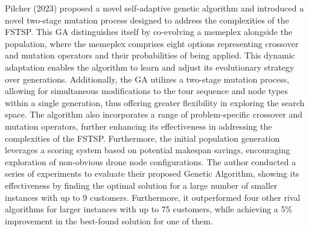 \documentclass{article}
\begin{document}
	\par
	Pilcher (2023) \cite{Pilcher2023} proposed a novel self-adaptive genetic algorithm and introduced a novel two-stage mutation process designed to address the complexities of the FSTSP. This GA distinguishes itself by co-evolving a memeplex alongside the population, where the memeplex comprises eight options representing crossover and mutation operators and their probabilities of being applied. This dynamic adaptation enables the algorithm to learn and adjust its evolutionary strategy over generations. Additionally, the GA utilizes a two-stage mutation process, allowing for simultaneous modifications to the tour sequence and node types within a single generation, thus offering greater flexibility in exploring the search space. The algorithm also incorporates a range of problem-specific crossover and mutation operators, further enhancing its effectiveness in addressing the complexities of the FSTSP. Furthermore, the initial population generation leverages a scoring system based on potential makespan savings, encouraging exploration of non-obvious drone node configurations. The author conducted a series of experiments to evaluate their proposed Genetic Algorithm, showing its effectiveness by finding the optimal solution for a large number of smaller instances with up to 9 customers. Furthermore, it outperformed four other rival algorithms for larger instances with up to 75 customers, while achieving a 5\% improvement in the best-found solution for one of them.
	
	
\end{document}
